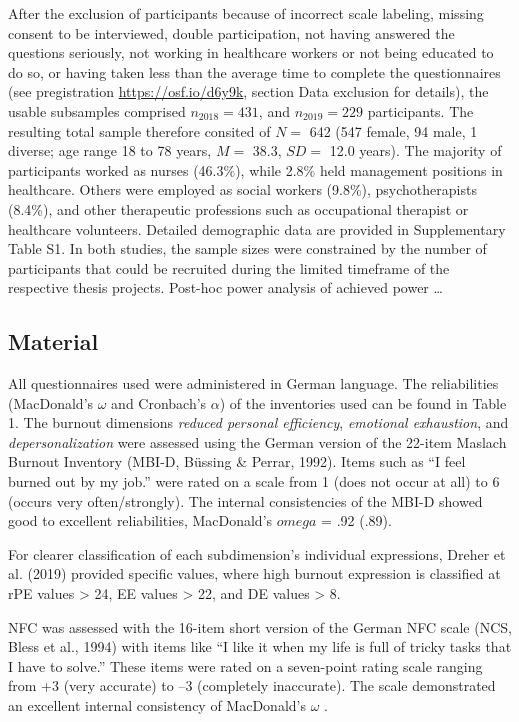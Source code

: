 \documentclass[
  man]{apa6}
\begin{document}
After the exclusion of participants because of incorrect scale labeling, missing consent to be interviewed, double participation, not having answered the questions seriously, not working in healthcare workers or not being educated to do so, or having taken less than the average time to complete the questionnaires (see pregistration \url{https://osf.io/d6y9k}, section Data exclusion for details), the usable subsamples comprised \(n_{2018}=431\), and \(n_{2019}=229\) participants. The resulting total sample therefore consited of \(N=\) 642 (547 female, 94 male, 1 diverse; age range 18 to 78 years, \(M=\) 38.3, \(SD=\) 12.0 years).
The majority of participants worked as nurses (46.3\%), while 2.8\% held management positions in healthcare.
Others were employed as social workers (9.8\%), psychotherapists (8.4\%), and other therapeutic professions such as occupational therapist or healthcare volunteers.
Detailed demographic data are provided in Supplementary Table S1.
In both studies, the sample sizes were constrained by the number of participants that could be recruited during the limited timeframe of the respective thesis projects. Post-hoc power analysis of achieved power \ldots{}

\subsection{Material}\label{material}

All questionnaires used were administered in German language.
The reliabilities (MacDonald's \(\omega\) and Cronbach's \(\alpha\)) of the inventories used can be found in Table 1.
The burnout dimensions \emph{reduced personal efficiency}, \emph{emotional exhaustion}, and \emph{depersonalization} were assessed using the German version of the 22-item Maslach Burnout Inventory (MBI-D, Büssing \& Perrar, 1992).
Items such as ``I feel burned out by my job.'' were rated on a scale from 1 (does not occur at all) to 6 (occurs very often/strongly).
The internal consistencies of the MBI-D showed good to excellent reliabilities, MacDonald's \(omega\) = .92 (.89).

For clearer classification of each subdimension's individual expressions, Dreher et al. (2019) provided specific values, where high burnout expression is classified at rPE values \textgreater{} 24, EE values \textgreater{} 22, and DE values \textgreater{} 8.

NFC was assessed with the 16-item short version of the German NFC scale (NCS, Bless et al., 1994) with items like ``I like it when my life is full of tricky tasks that I have to solve.'' These items were rated on a seven-point rating scale ranging from +3 (very accurate) to --3 (completely inaccurate).
The scale demonstrated an excellent internal consistency of MacDonald's \(\omega\) .
\end{document}
